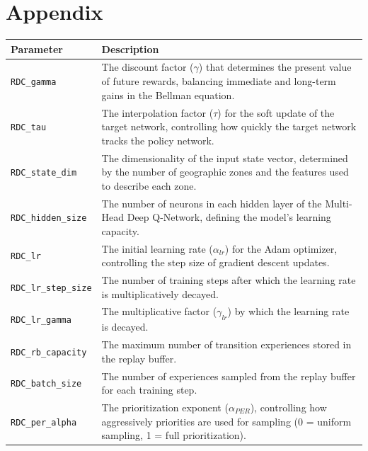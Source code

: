 \appendix

\chapter{Appendix}\label{sec:appendix}

\begin{xltabular}{\textwidth}{lX}
        \toprule
        \textbf{Parameter}                  & \textbf{Description} \\
        \midrule
        \texttt{RDC\_gamma}                 & The discount factor ($\gamma$) that determines the present value of future rewards, balancing immediate and long-term gains in the Bellman equation. \\
        \texttt{RDC\_tau}                   & The interpolation factor ($\tau$) for the soft update of the target network, controlling how quickly the target network tracks the policy network. \\
        \midrule
        \texttt{RDC\_state\_dim}            & The dimensionality of the input state vector, determined by the number of geographic zones and the features used to describe each zone. \\
        \texttt{RDC\_hidden\_size}          & The number of neurons in each hidden layer of the Multi-Head Deep Q-Network, defining the model's learning capacity. \\
        \midrule
        \texttt{RDC\_lr}                    & The initial learning rate ($\alpha_{lr}$) for the Adam optimizer, controlling the step size of gradient descent updates. \\
        \texttt{RDC\_lr\_step\_size}        & The number of training steps after which the learning rate is multiplicatively decayed. \\
        \texttt{RDC\_lr\_gamma}             & The multiplicative factor ($\gamma_{lr}$) by which the learning rate is decayed. \\
        \midrule
        \texttt{RDC\_rb\_capacity}          & The maximum number of transition experiences stored in the replay buffer. \\
        \texttt{RDC\_batch\_size}           & The number of experiences sampled from the replay buffer for each training step. \\
        \texttt{RDC\_per\_alpha}            & The prioritization exponent ($\alpha_{PER}$), controlling how aggressively priorities are used for sampling (0 = uniform sampling, 1 = full prioritization). \\

\end{xltabular}
